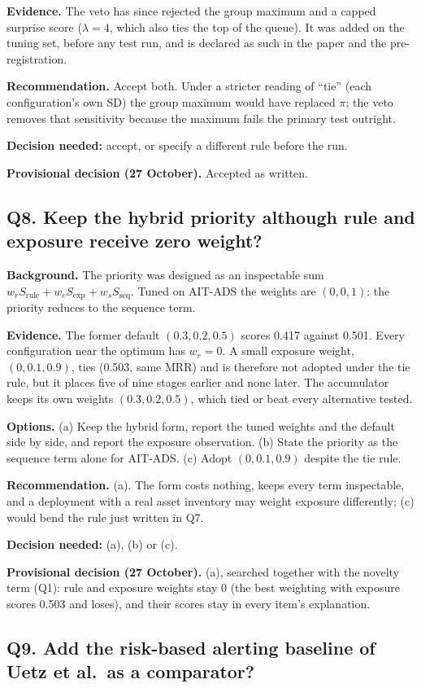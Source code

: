 \documentclass[10.5pt,a4paper]{article}
\newcommand{\rec}[1]{\par\smallskip\noindent\colorbox{gray!12}{\parbox{\dimexpr\linewidth-2\fboxsep}{\textbf{Recommendation.} #1}}\par\smallskip}
\newcommand{\ask}[1]{\par\noindent\textbf{Decision needed:} #1\par\medskip}
\newcommand{\dec}[1]{\par\smallskip\noindent\colorbox{blue!8}{\parbox{\dimexpr\linewidth-2\fboxsep}{\textbf{Provisional decision (27 October).} #1}}\par\medskip}
\newcommand{\sub}[1]{\par\smallskip\noindent\textbf{#1}\quad}
\begin{document}
\sub{Evidence.} The veto has since rejected the group maximum and a capped surprise score ($\lambda = 4$, which also ties the top of the queue). It was added on the tuning set, before any test run, and is declared as such in the paper and the pre-registration.

\rec{Accept both. Under a stricter reading of ``tie'' (each configuration's own SD) the group maximum would have replaced $\pi$; the veto removes that sensitivity because the maximum fails the primary test outright.}
\ask{accept, or specify a different rule before the run.}
\dec{Accepted as written.}

\subsection*{Q8. Keep the hybrid priority although rule and exposure receive zero weight?}

\sub{Background.} The priority was designed as an inspectable sum $w_r S_\mathrm{rule} + w_c S_\mathrm{exp} + w_s S_\mathrm{seq}$. Tuned on AIT-ADS the weights are $(0, 0, 1)$: the priority reduces to the sequence term.

\sub{Evidence.} The former default $(0.3, 0.2, 0.5)$ scores 0.417 against 0.501. Every configuration near the optimum has $w_r = 0$. A small exposure weight, $(0, 0.1, 0.9)$, ties (0.503, same MRR) and is therefore not adopted under the tie rule, but it places five of nine stages earlier and none later. The accumulator keeps its own weights $(0.3, 0.2, 0.5)$, which tied or beat every alternative tested.

\sub{Options.} (a) Keep the hybrid form, report the tuned weights and the default side by side, and report the exposure observation. (b) State the priority as the sequence term alone for AIT-ADS. (c) Adopt $(0, 0.1, 0.9)$ despite the tie rule.

\rec{(a). The form costs nothing, keeps every term inspectable, and a deployment with a real asset inventory may weight exposure differently; (c) would bend the rule just written in Q7.}
\ask{(a), (b) or (c).}
\dec{(a), searched together with the novelty term (Q1): rule and exposure weights stay 0 (the best weighting with exposure scores 0.503 and loses), and their scores stay in every item's explanation.}


\subsection*{Q9. Add the risk-based alerting baseline of Uetz et al.\ as a comparator?}
\end{document}
